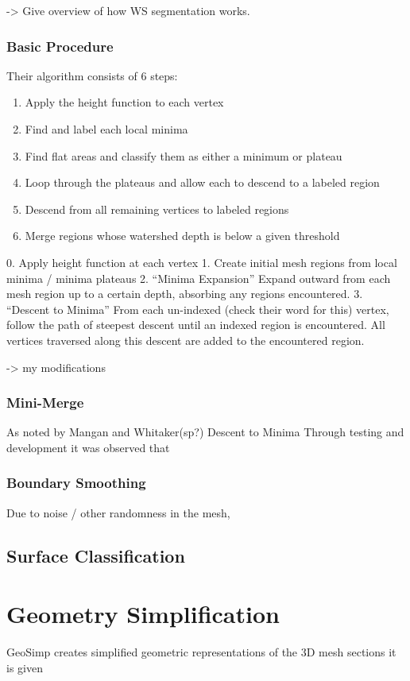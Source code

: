 -> Give overview of how WS segmentation works.
\subsubsection{Basic Procedure}
Their algorithm consists of 6 steps:
\begin{enumerate}
	\item Apply the height function to each vertex
	\item Find and label each local minima
	\item Find flat areas and classify them as either a minimum or plateau
	\item Loop through the plateaus and allow each to descend to a labeled region
	\item Descend from all remaining vertices to labeled regions
	\item Merge regions whose watershed depth is below a given threshold
\end{enumerate}

0. Apply height function at each vertex
1. Create initial mesh regions from local minima / minima plateaus
2. ``Minima Expansion'' Expand outward from each mesh region up to a certain depth, absorbing any regions encountered.
3. ``Descent to Minima'' From each un-indexed (check their word for this) vertex, follow the path of steepest descent until an indexed region is encountered.
All vertices traversed along this descent are added to the encountered region.

-> my modifications
\subsubsection{Mini-Merge}
As noted by Mangan and Whitaker(sp?) Descent to Minima Through testing and development it was observed that

\subsubsection{Boundary Smoothing}
Due to noise / other randomness in the mesh,

\subsection{Surface Classification}

\section{Geometry Simplification}
GeoSimp creates simplified geometric representations of the 3D mesh sections it is given

